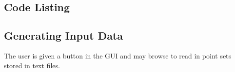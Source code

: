 \subsection{Code Listing}



\subsection{Generating Input Data}

The user is given a button in the GUI and may browse to read in point sets
stored in text files.
